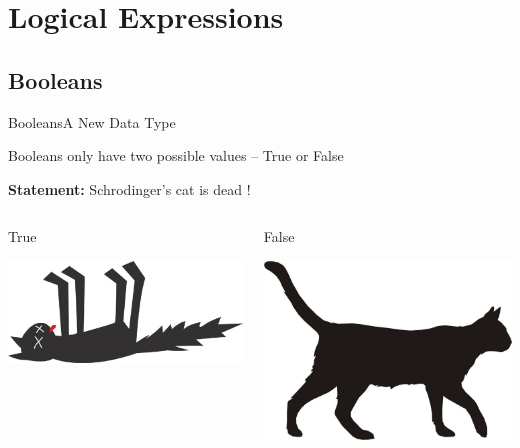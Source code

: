 \section{Logical Expressions}

\subsection{Booleans}
\begin{frame}[fragile]{Booleans}{A New Data Type}
    \begin{block}{}
        Booleans only have two possible values -- True or False
    \end{block}
    \pause
    \vspace{1.5em}
    {\Large \textbf{Statement:} Schrodinger's cat is dead !}
    \begin{columns}[c]
            \begin{block}{True}
            \begin{center}
                \includegraphics[width=\linewidth]{images/dead_cat.jpg}
            \end{center}
            \end{block}
            \begin{block}{False}
            \begin{center}
                \includegraphics[width=\linewidth]{images/cat.jpg}

\end{center}
\end{block}
\end{columns}
\end{frame}
